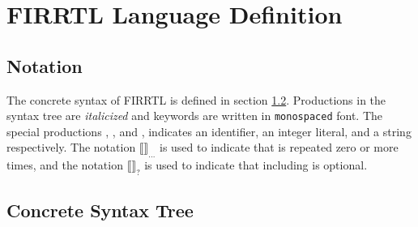\documentclass[12pt]{article}
\begin{document}
\section{FIRRTL Language Definition}
\newcommand{\pipe}{\textbar}
\newcommand{\opt}[1]{$\llbracket$#1$\rrbracket_?$}
\newcommand{\rpt}[1]{$\llbracket$#1$\rrbracket_{...}$}
\subsection{Notation}
The concrete syntax of FIRRTL is defined in section \ref{syntax_tree}. Productions in the syntax tree are {\em italicized} and keywords are written in \verb|monospaced| font. The special productions , , and , indicates an identifier, an integer literal, and a string respectively. The notation \rpt{} is used to indicate that  is repeated zero or more times, and the notation \opt{} is used to indicate that including  is optional.

\subsection{Concrete Syntax Tree} \label{syntax_tree}
\end{document}
